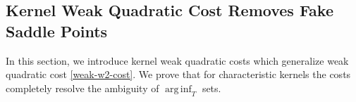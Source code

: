 \documentclass{article} %
\DeclareMathOperator*{\arginf}{arg\,inf}
\begin{document}

    
    

\vspace{-2mm}\subsection{Kernel Weak Quadratic Cost Removes Fake Saddle Points}
\label{sec-kernel-w2}
\vspace{-2mm}In this section, we introduce kernel weak quadratic costs which generalize weak quadratic cost \eqref{weak-w2-cost}. We prove that for characteristic kernels the costs completely resolve the ambiguity of $\arginf_{T}$ sets.
\end{document}
